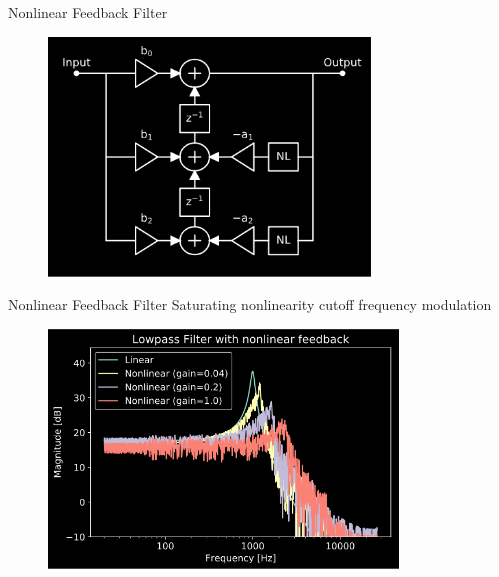 \begin{frame}{Nonlinear Feedback Filter}
    \begin{figure}
        \includegraphics[height=2.5in]{../NonlinearFeedback/Pics/NL2-TDF-II.png}
    \end{figure}
\end{frame}

\begin{frame}{Nonlinear Feedback Filter}
    Saturating nonlinearity \rightarrow cutoff frequency modulation
    \begin{figure}
        \includegraphics[height=2.5in]{../NonlinearFeedback/Pics/LPF-NL.png}
    \end{figure}
\end{frame}

